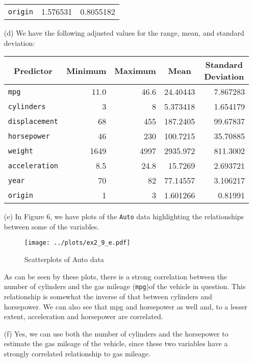 \begin{itemize}
\begin{center}
\begin{tabular}{ l | r | r }
            \verb|origin| & 1.576531 & 0.8055182
        \end{tabular}
    \end{center}
    \item[(d)] We have the following adjusted values for the range, mean, and 
    standard deviation:
    \begin{center}
        \begin{tabular}{ l | r | r | r | r }
            \multicolumn{1}{c}{Predictor} & \multicolumn{1}{c}{Minimum} 
            & \multicolumn{1}{c}{Maximum} & \multicolumn{1}{c}{Mean} 
            & \multicolumn{1}{c}{Standard Deviation} \\
            \hline
            \verb|mpg| & 11.0 & 46.6 & 24.40443 & 7.867283 \\
            \verb|cylinders| & 3 & 8 & 5.373418 & 1.654179 \\
            \verb|displacement| & 68 & 455 & 187.2405 & 99.67837 \\
            \verb|horsepower| & 46 & 230 & 100.7215 & 35.70885 \\
            \verb|weight| & 1649 & 4997 & 2935.972 & 811.3002 \\
            \verb|acceleration| & 8.5 & 24.8 & 15.7269 & 2.693721 \\
            \verb|year| & 70 & 82 & 77.14557 & 3.106217 \\
            \verb|origin| & 1 & 3 & 1.601266 & 0.81991
        \end{tabular}
    \end{center}
    \item[(e)]
    In Figure 6, we have plots of the \verb|Auto| data highlighting the 
    relationships between some of the variables.
    \begin{figure}[!ht]
        \texttt{[image: ../plots/ex2\_9\_e.pdf]}
        \caption{Scatterplots of Auto data}
    \end{figure}
    As can be seen by these plots, there is a strong correlation between the
    number of cylinders and the gas mileage (\verb|mpg|)of the vehicle in question.
    This relationship is somewhat the inverse of that between cylinders and
    horsepower. We can also see that mpg and horsepower as well and, to a lesser
    extent, acceleration and horsepower are correlated.
    \item[(f)]
    Yes, we can use both the number of cylinders and the horsepower to estimate
    the gas mileage of the vehicle, since these two variables have a strongly
    correlated relationship to gas mileage.
\end{itemize}
